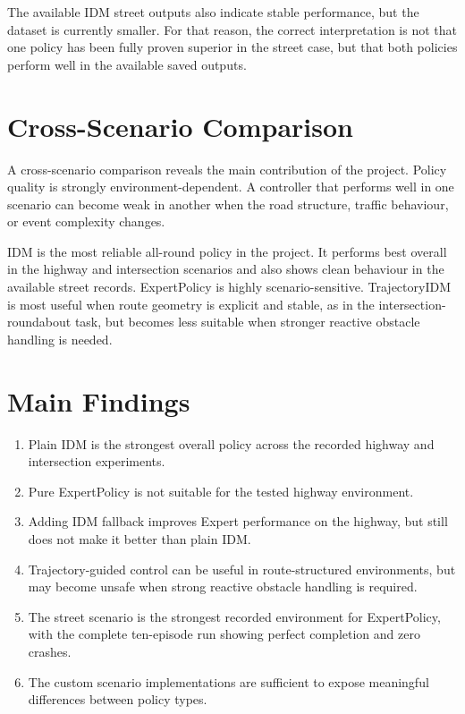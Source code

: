 \documentclass[12pt,a4paper]{report}
\begin{document}
The available IDM street outputs also indicate stable performance, but the dataset is currently smaller. For that reason, the correct interpretation is not that one policy has been fully proven superior in the street case, but that both policies perform well in the available saved outputs.

\section{Cross-Scenario Comparison}
A cross-scenario comparison reveals the main contribution of the project. Policy quality is strongly environment-dependent. A controller that performs well in one scenario can become weak in another when the road structure, traffic behaviour, or event complexity changes.

IDM is the most reliable all-round policy in the project. It performs best overall in the highway and intersection scenarios and also shows clean behaviour in the available street records. ExpertPolicy is highly scenario-sensitive. TrajectoryIDM is most useful when route geometry is explicit and stable, as in the intersection-roundabout task, but becomes less suitable when stronger reactive obstacle handling is needed.

\section{Main Findings}
\begin{enumerate}[label=\arabic*.]
    \item Plain IDM is the strongest overall policy across the recorded highway and intersection experiments.
    \item Pure ExpertPolicy is not suitable for the tested highway environment.
    \item Adding IDM fallback improves Expert performance on the highway, but still does not make it better than plain IDM.
    \item Trajectory-guided control can be useful in route-structured environments, but may become unsafe when strong reactive obstacle handling is required.
    \item The street scenario is the strongest recorded environment for ExpertPolicy, with the complete ten-episode run showing perfect completion and zero crashes.
    \item The custom scenario implementations are sufficient to expose meaningful differences between policy types.
    \end{enumerate}
\end{document}
